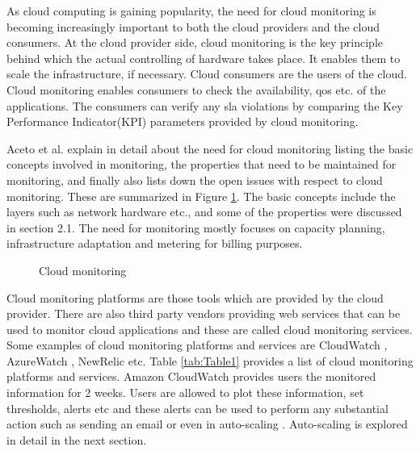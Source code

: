 \documentclass[article,type=msc,colorback,12pt,accentcolor=tud8b,table]{tudthesis}
\begin{document}
 	As cloud computing is gaining popularity, the need for cloud monitoring is becoming increasingly important to  both the cloud providers and the cloud consumers. At the cloud provider side, cloud monitoring is the key principle behind which the actual controlling of hardware takes place. It enables them to scale the infrastructure, if necessary. Cloud consumers are the users of the cloud. Cloud monitoring enables consumers to check the availability, \gls{qos} etc. of the applications. The consumers can verify any \gls{sla} violations by comparing the Key Performance Indicator(KPI) parameters provided by cloud monitoring.
 	
 	Aceto et al. \cite{aceto2013cloud} explain in detail about the need for cloud monitoring listing the basic concepts involved in monitoring, the properties that need to be maintained for monitoring, and finally also lists down the open issues with respect to cloud monitoring. These are summarized in Figure \ref{fig:cloud_monitor}. The basic concepts include the layers such as network hardware etc., and some of the properties were discussed in section 2.1. The need for monitoring mostly focuses on capacity planning, infrastructure adaptation and metering for billing purposes.
 	
 	\begin{figure}
 		\begin{center}
 			\makebox[\textwidth]{\texttt{[image: B5]}}
 		\end{center}
 		\caption{Cloud monitoring \cite{aceto2013cloud}}
 		\label{fig:cloud_monitor}
 	\end{figure}
	
	Cloud monitoring platforms are those tools which are provided by the cloud provider. There are also third party vendors providing web services that can be used to monitor cloud applications and these are called cloud monitoring services. Some examples of cloud monitoring platforms and services are CloudWatch \cite{cloudwatch}, AzureWatch \cite{azurewatch} , NewRelic \cite{newrelic} etc. Table \ref{tab:Table1} provides a list of cloud monitoring platforms and services. Amazon CloudWatch provides users the monitored information for 2 weeks. Users are allowed to plot these information, set thresholds, alerts etc and these alerts can be used to perform any substantial action such as sending an email or even in auto-scaling \cite{aas}. Auto-scaling is explored in detail in the next section. 
	
\end{document}
